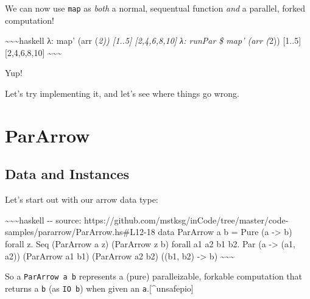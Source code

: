 \documentclass[]{article}
\begin{document}
We can now use \texttt{map\textquotesingle{}} as \emph{both} a normal,
sequentual function \emph{and} a parallel, forked computation!

\textasciitilde{}\textasciitilde{}\textasciitilde{}haskell λ: map' (arr
(\emph{2)) {[}1..5{]} {[}2,4,6,8,10{]} λ: runPar \$ map' (arr (}2)) {[}1..5{]}
{[}2,4,6,8,10{]} \textasciitilde{}\textasciitilde{}\textasciitilde{}

Yup!

Let's try implementing it, and let's see where things go wrong.

\section{ParArrow}

\subsection{Data and Instances}

Let's start out with our arrow data type:

\textasciitilde{}\textasciitilde{}\textasciitilde{}haskell -\/- source:
https://github.com/mstksg/inCode/tree/master/code-samples/pararrow/ParArrow.hs\#L12-18
data ParArrow a b = Pure (a -\textgreater{} b) \textbar{} forall z. Seq
(ParArrow a z) (ParArrow z b) \textbar{} forall a1 a2 b1 b2. Par (a
-\textgreater{} (a1, a2)) (ParArrow a1 b1) (ParArrow a2 b2) ((b1, b2)
-\textgreater{} b) \textasciitilde{}\textasciitilde{}\textasciitilde{}

So a \texttt{ParArrow\ a\ b} represents a (pure) paralleizable, forkable
computation that returns a \texttt{b} (as \texttt{IO\ b}) when given an
\texttt{a}.{[}\^{}unsafepio{]}
\end{document}
